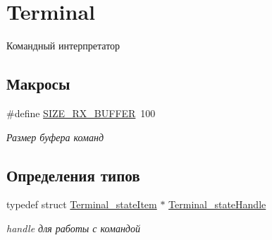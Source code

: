 \hypertarget{group__terminal}{}\section{Terminal}
\label{group__terminal}


Командный интерпретатор  


\subsection*{Макросы}
\begin{DoxyCompactItemize}
\item 
\#define \mbox{\hyperlink{group__terminal_gab480fdc4b952fd3ce8109b25dd19ce05}{S\+I\+Z\+E\+\_\+\+R\+X\+\_\+\+B\+U\+F\+F\+ER}}~100
\begin{DoxyCompactList}\small\item\em Размер буфера команд \end{DoxyCompactList}\end{DoxyCompactItemize}
\subsection*{Определения типов}
\begin{DoxyCompactItemize}
\item 
typedef struct \mbox{\hyperlink{struct_terminal__state_item}{Terminal\+\_\+state\+Item}} $\ast$ \mbox{\hyperlink{group__terminal_gadcd4acb437149111c071e40bccbac72a}{Terminal\+\_\+state\+Handle}}
\begin{DoxyCompactList}\small\item\em handle для работы с командой \end{DoxyCompactList}\end{DoxyCompactItemize}
